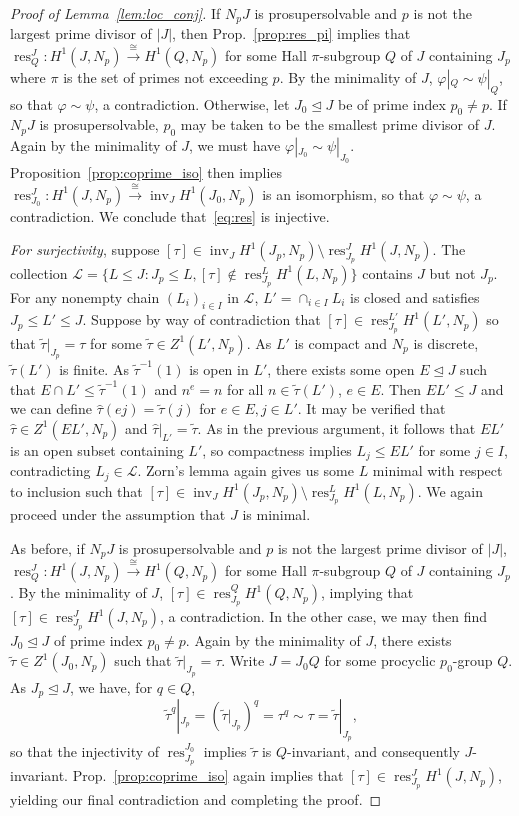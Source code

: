 \documentclass{amsart}
\theoremstyle{definition}
\theoremstyle{remark}
\numberwithin{equation}{section}
\newcommand{\iso}{\cong}
\newcommand{\normal}{\trianglelefteq}
\providecommand{\abs}[1]{\ensuremath{\lvert#1\rvert}}
\renewcommand{\phi}{\varphi}
\DeclareMathOperator{\inv}{inv}
\DeclareMathOperator{\res}{res}
\begin{document}
\begin{proof}[Proof of Lemma~\ref{lem:loc_conj}]
	If $N_pJ$ is prosupersolvable and $p$ is not the largest prime divisor of $\abs{J}$, then Prop.~\ref{prop:res_pi} implies that $\res^J_Q: H^1(J, N_p) \xrightarrow\iso H^1(Q, N_p)$ for some Hall $\pi$-subgroup $Q$ of $J$ containing $J_p$ where $\pi$ is the set of primes not exceeding $p$. By the minimality of $J$, $\phi|_Q\sim\psi|_Q$, so that $\phi \sim\psi$, a contradiction. Otherwise, let $J_0 \normal J$ be of prime index $p_0\ne p$. If $N_pJ$ is prosupersolvable, $p_0$ may be taken to be the smallest prime divisor of $J$. Again by the minimality of $J$, we must have $\phi|_{J_0}\sim\psi|_{J_0}$. Proposition~\ref{prop:coprime_iso} then implies $\res^J_{J_0}: H^1(J, N_p) \xrightarrow\iso \inv_J H^1(J_0, N_p)$ is an isomorphism, so that $\phi\sim\psi$, a contradiction. We conclude that~\eqref{eq:res} is injective.

	\emph{For surjectivity}, suppose $[\tau]\in  \inv_J H^1(J_p, N_p) \setminus \res^J_{J_p} H^1(J,N_p)$. The collection $\mathcal L = \{L \leq J: J_p \leq L, [\tau] \notin \res^{L}_{J_p} H^1(L,N_p)\}$ contains $J$ but not $J_p$. For any nonempty chain $(L_i)_{i \in I}$ in $\mathcal L$, $L'=\cap_{i\in I} L_i$ is closed and satisfies $J_p \leq L' \leq J$. Suppose by way of contradiction that $[\tau] \in \res^{L'}_{J_p} H^1(L',N_p)$ so that $\tilde\tau|_{J_p}=\tau$ for some $\tilde\tau \in Z^1(L', N_p)$. As $L'$ is compact and $N_p$ is discrete, $\tilde\tau(L')$ is finite. As $\tilde\tau^{-1}(1)$ is open in $L'$, there exists some open $E\normal J$ such that $E \cap L' \leq \tilde\tau^{-1}(1)$ and $n^e=n$ for all $n \in \tilde\tau(L')$, $e\in E$. Then $EL' \leq J$ and we can define $\hat \tau(ej)=\tilde \tau(j)$ for $e \in E, j\in L'$. It may be verified that $\hat \tau \in Z^1(EL', N_p)$ and $\hat \tau |_{L'} = \tilde \tau$. As in the previous argument, it follows that $EL'$ is an open subset containing $L'$, so compactness implies $L_j \leq EL'$ for some $j\in I$, contradicting $L_j \in \mathcal L$. Zorn's lemma again gives us some $L$ minimal with respect to inclusion such that $[\tau]\in  \inv_J H^1(J_p, N_p) \setminus \res^{L}_{J_p} H^1(L,N_p)$. We again proceed under the assumption that $J$ is minimal.

	As before, if $N_pJ$ is prosupersolvable and $p$ is not the largest prime divisor of $\abs{J}$, $\res^J_Q: H^1(J, N_p) \xrightarrow\iso H^1(Q, N_p)$ for some Hall $\pi$-subgroup $Q$ of $J$ containing $J_p$. By the minimality of $J$, $[\tau] \in \res^{Q}_{J_p} H^1(Q,N_p)$, implying that $[\tau] \in \res^{J}_{J_p} H^1(J,N_p)$, a contradiction. In the other case, we may then find $J_0 \normal J$ of prime index $p_0 \ne p$. Again by the minimality of $J$, there exists $\tilde \tau \in Z^1(J_0,N_p)$ such that $\tilde\tau|_{J_p} = \tau$. Write $J=J_0Q$ for some procyclic $p_0$-group $Q$. As $J_p\normal J$, we have, for $q\in Q$,
	\[
		\tilde\tau^q|_{J_p}
		= \left(\tilde\tau|_{J_p}\right)^q
		= \tau^q
		\sim \tau
		= \tilde\tau|_{J_p},
	\]
	so that the injectivity of $\res^{J_0}_{J_p}$ implies $\tilde \tau$ is $Q$-invariant, and consequently $J$-invariant. Prop.~\ref{prop:coprime_iso} again implies that $[\tau] \in \res^{J}_{J_p} H^1(J,N_p)$, yielding our final contradiction and completing the proof.
\end{proof}
\end{document}

